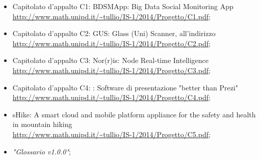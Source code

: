 \begin{itemize}
    \item Capitolato d’appalto C1: BDSMApp: Big Data Social Monitoring App \\ \url{http://www.math.unipd.it/~tullio/IS-1/2014/Progetto/C1.pdf};
    \item Capitolato d’appalto C2: GUS: Glass (Uni) Scanner, all’indirizzo \\ \url{http://www.math.unipd.it/~tullio/IS-1/2014/Progetto/C2.pdf};
    \item Capitolato d’appalto C3: Nor(r)is: Node Real-time Intelligence \\ \url{http://www.math.unipd.it/~tullio/IS-1/2014/Progetto/C3.pdf};
    \item Capitolato d’appalto C4: \PROGETTO: Software di presentazione "better than Prezi" \\ \url{http://www.math.unipd.it/~tullio/IS-1/2014/Progetto/C4.pdf};
    \item sHike: A smart cloud and mobile platform appliance for the safety and health in mountain hiking \\ \url{http://www.math.unipd.it/~tullio/IS-1/2014/Progetto/C5.pdf};
    \item \textit{"Glossario v1.0.0"};
 
 
 

\end{itemize}
